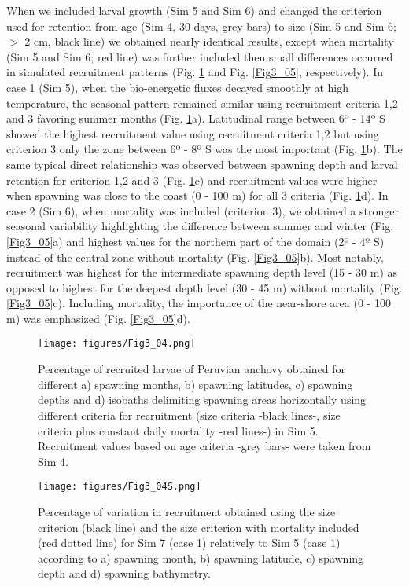 When we included larval growth (Sim 5 and Sim 6) and changed the criterion used for retention from age (Sim 4, 30 days, grey bars) to size (Sim 5 and Sim 6; $>$ 2 cm, black line) we obtained nearly identical results, except when mortality (Sim 5 and Sim 6; red line) was further included then small differences occurred in simulated recruitment patterns (Fig. \ref{Fig3_04} and Fig. \ref{Fig3_05}, respectively). In case 1 (Sim 5), when the bio-energetic fluxes decayed smoothly at high temperature, the seasonal pattern remained similar using recruitment criteria 1,2 and 3 favoring summer months (Fig. \ref{Fig3_04}a). Latitudinal range between 6º - 14º S showed the highest recruitment value using recruitment criteria 1,2 but using criterion 3 only the zone between 6º - 8º S was the most important (Fig. \ref{Fig3_04}b). The same typical direct relationship was observed between spawning depth and larval retention for criterion 1,2 and 3 (Fig. \ref{Fig3_04}c) and recruitment values were higher when spawning was close to the coast (0 - 100 m) for all 3 criteria (Fig. \ref{Fig3_04}d). In case 2 (Sim 6), when mortality was included (criterion 3), we obtained a stronger seasonal variability highlighting the difference between summer and winter (Fig. \ref{Fig3_05}a) and highest values for the northern part of the domain (2º - 4º S) instead of the central zone without mortality (Fig. \ref{Fig3_05}b). Most notably, recruitment was highest for the intermediate spawning depth level (15 - 30 m) as opposed to highest for the deepest depth level (30 - 45 m) without mortality (Fig. \ref{Fig3_05}c). Including mortality, the importance of the near-shore area (0 - 100 m) was emphasized (Fig. \ref{Fig3_05}d).\\

\begin{figure}[ht]
	\texttt{[image: figures/Fig3\_04.png]}
	\centering
	\caption{Percentage of recruited larvae of Peruvian anchovy obtained for different a) spawning months, b) spawning latitudes, c) spawning depths and d) isobaths delimiting spawning areas horizontally using different criteria for recruitment (size criteria -black lines-, size criteria plus constant daily mortality -red lines-) in Sim 5. Recruitment values based on age criteria -grey bars- were taken from Sim 4.}
	\label{Fig3_04}
\end{figure}

\begin{figure}[ht]
	\texttt{[image: figures/Fig3\_04S.png]}
	\centering
	\caption{Percentage of variation in recruitment obtained using the size criterion (black line) and the size criterion with mortality included (red dotted line) for Sim 7 (case 1) relatively to Sim 5 (case 1) according to a) spawning month, b) spawning latitude, c) spawning depth and d) spawning bathymetry.}
	\label{Fig3_04S}
\end{figure}

